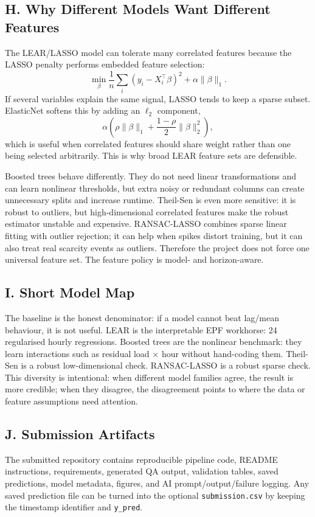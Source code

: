 \documentclass[10pt,a4paper]{article}
\newcommand{\code}[1]{\texttt{#1}}
\begin{document}
\subsection*{H. Why Different Models Want Different Features}
The LEAR/LASSO model can tolerate many correlated features because the LASSO penalty performs embedded feature selection:
\[
  \min_\beta \frac{1}{n}\sum_i(y_i-X_i^\top\beta)^2+\alpha\|\beta\|_1.
\]
If several variables explain the same signal, LASSO tends to keep a sparse subset. ElasticNet softens this by adding an $\ell_2$ component,
\[
  \alpha\left(\rho\|\beta\|_1+\frac{1-\rho}{2}\|\beta\|_2^2\right),
\]
which is useful when correlated features should share weight rather than one being selected arbitrarily. This is why broad LEAR feature sets are defensible.

Boosted trees behave differently. They do not need linear transformations and can learn nonlinear thresholds, but extra noisy or redundant columns can create unnecessary splits and increase runtime. Theil-Sen is even more sensitive: it is robust to outliers, but high-dimensional correlated features make the robust estimator unstable and expensive. RANSAC-LASSO combines sparse linear fitting with outlier rejection; it can help when spikes distort training, but it can also treat real scarcity events as outliers. Therefore the project does not force one universal feature set. The feature policy is model- and horizon-aware.

\subsection*{I. Short Model Map}
The baseline is the honest denominator: if a model cannot beat lag/mean behaviour, it is not useful. LEAR is the interpretable EPF workhorse: 24 regularised hourly regressions. Boosted trees are the nonlinear benchmark: they learn interactions such as residual load $\times$ hour without hand-coding them. Theil-Sen is a robust low-dimensional check. RANSAC-LASSO is a robust sparse check. This diversity is intentional: when different model families agree, the result is more credible; when they disagree, the disagreement points to where the data or feature assumptions need attention.

\subsection*{J. Submission Artifacts}
The submitted repository contains reproducible pipeline code, README instructions, requirements, generated QA output, validation tables, saved predictions, model metadata, figures, and AI prompt/output/failure logging. Any saved prediction file can be turned into the optional \code{submission.csv} by keeping the timestamp identifier and \code{y\_pred}.
\end{document}
